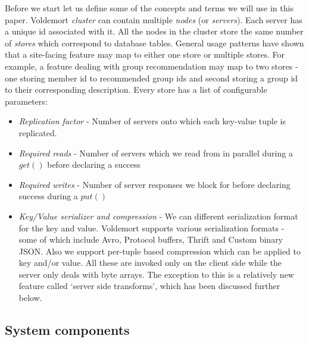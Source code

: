 \documentclass[10pt,twocolumn,preprint,natbib,authoryear]{sigplanconf}
\begin{document}
Before we start let us define some of the concepts and terms we will use in this paper. Voldemort \emph{cluster} can contain multiple \emph{nodes} (or \emph{servers}). Each server has a unique id associated with it. All the nodes in the cluster store the same number of \emph{stores} which correspond to database tables. General usage patterns have shown that a site-facing feature may map to either one store or multiple stores. For example, a feature dealing with group recommendation may map to two stores - one storing member id to recommended group ids and second storing a group id to their corresponding description. Every store has a list of configurable parameters:
\begin{itemize}
	\item \emph {Replication factor} - Number of servers onto which each key-value tuple is replicated. 
	\item \emph {Required reads} - Number of servers which we read from in parallel during a $get()$ before declaring a success
	\item \emph {Required writes} - Number of server responses we block for before declaring success during a $put()$
	\item \emph {Key/Value serializer and compression} - We can different serialization format for the key and value. Voldemort supports various serialization formats - some of which include Avro, Protocol buffers, Thrift and Custom binary JSON. Also we support per-tuple based compression which can be applied to key and/or value. All these are invoked only on the client side while the server only deals with byte arrays. The exception to this is a relatively new feature called `server side transforms', which has been discussed further below. 
\end{itemize}



\subsection{System components}
\label{sec:system_architecture:system_components}
\end{document}
